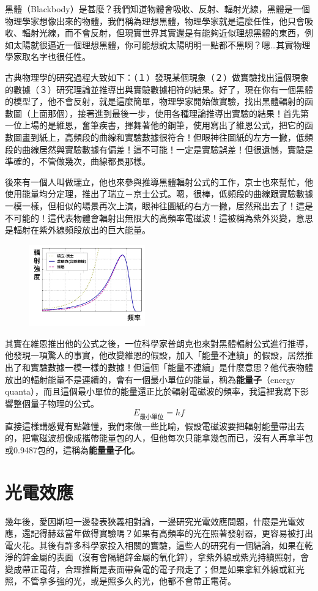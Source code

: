 黑體（Blackbody）是甚麼？我們知道物體會吸收、反射、輻射光線，黑體是一個物理學家想像出來的物體，我們稱為理想黑體，物理學家就是這麼任性，他只會吸收、輻射光線，而不會反射，但現實世界其實還是有能夠近似理想黑體的東西，例如太陽就很逼近一個理想黑體，你可能想說太陽明明一點都不黑啊？嗯…其實物理學家取名字也很任性。

古典物理學的研究過程大致如下：（１）發現某個現象（２）做實驗找出這個現象的數據（３）研究理論並推導出與實驗數據相符的結果。好了，現在你有一個黑體的模型了，他不會反射，就是這麼簡單，物理學家開始做實驗，找出黑體輻射的函數圖（上面那個），接著進到最後一步，使用各種理論推導出實驗的結果！首先第一位上場的是維恩，奮筆疾書，揮舞著他的鋼筆，使用寫出了維恩公式，把它的函數圖畫到紙上，高頻段的曲線和實驗數據很符合！但眼神往圖紙的左方一撇，低頻段的曲線居然與實驗數據有偏差！這不可能！一定是實驗誤差！但很遺憾，實驗是準確的，不管做幾次，曲線都長那樣。

後來有一個人叫做瑞立，他也來參與推導黑體輻射公式的工作，京士也來幫忙，他使用能量均分定理，推出了瑞立－京士公式。嗯，很棒，低頻段的曲線跟實驗數據一模一樣，但相似的場景再次上演，眼神往圖紙的右方一撇，居然飛出去了！這是不可能的！這代表物體會輻射出無限大的高頻率電磁波！這被稱為紫外災變，意思是輻射在紫外線頻段放出的巨大能量。
\begin{figure}[H]
\centering
\graphicspath{{physics/}}
\includegraphics[width=5cm, center]{ultraviolet-catastrophe.png}
\label{fig:ultraviolet-catastrophe}
\end{figure}
其實在維恩推出他的公式之後，一位科學家普朗克也來對黑體輻射公式進行推導，他發現一項驚人的事實，他改變維恩的假設，加入「能量不連續」的假設，居然推出了和實驗數據一模一樣的數據！但這個「能量不連續」是什麼意思？他代表物體放出的輻射能量不是連續的，會有一個最小單位的能量，稱為\textbf{能量子}（energy quanta），而且這個最小單位的能量還正比於輻射電磁波的頻率，我這裡我寫下影響整個量子物理的公式。
$$E_{\mbox{最小單位}} = hf$$
直接這樣講感覺有點難懂，我們來做一些比喻，假設電磁波要把輻射能量帶出去的，把電磁波想像成攜帶能量包的人，但他每次只能拿幾包而已，沒有人再拿半包或0.9487包的，這稱為\textbf{能量量子化}。

\section{光電效應}
幾年後，愛因斯坦一邊發表狹義相對論，一邊研究光電效應問題，什麼是光電效應，還記得赫茲當年做得實驗嗎？如果有高頻率的光在照著發射器，更容易被打出電火花。其後有許多科學家投入相關的實驗，這些人的研究有一個結論，如果在乾淨的鋅金屬的表面（沒有會隔絕鋅金屬的氧化鋅），拿紫外線或紫光持續照射，會變成帶正電荷，合理推斷是表面帶負電的電子飛走了；但是如果拿紅外線或紅光照，不管拿多強的光，或是照多久的光，他都不會帶正電荷。

